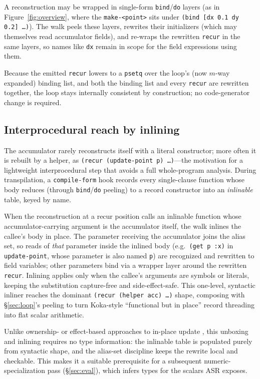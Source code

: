 \documentclass[sigplan,screen,review,anonymous]{acmart}
\begin{document}
A reconstruction may be wrapped in single-form \texttt{bind}/\texttt{do} layers
(as in Figure~\ref{fig:overview}, where the \texttt{make-<point>} sits under
\texttt{(bind [dx 0.1 dy 0.2] \ldots)}). The walk peels these layers, rewrites
their initializers (which may themselves read accumulator fields), and re-wraps
the rewritten \texttt{recur} in the same layers, so names like \texttt{dx}
remain in scope for the field expressions using them.

Because the emitted \texttt{recur} lowers to a \texttt{psetq} over the loop's
(now $m$-way expanded) binding list, and both the binding list and every
\texttt{recur} are rewritten together, the loop stays internally consistent by
construction; no code-generator change is required.

\subsection{Interprocedural reach by inlining}
\label{sec:inline}

The accumulator rarely reconstructs itself with a literal constructor; more
often it is rebuilt by a helper, as \texttt{(recur (update-point p) \ldots)}---the
motivation for a lightweight interprocedural step that avoids a full
whole-program analysis. During transpilation, a
\texttt{compile-form} hook records every single-clause function whose body
reduces (through \texttt{bind}/\texttt{do} peeling) to a record constructor
into an \emph{inlinable} table, keyed by name.

When the reconstruction at a recur position calls an inlinable function
whose accumulator-carrying argument is the accumulator itself, the walk
inlines the callee's body in place. The parameter receiving the
accumulator joins the alias set, so reads of \emph{that} parameter inside
the inlined body (e.g.\ \texttt{(get p :x)} in \texttt{update-point}, whose
parameter is also named \texttt{p}) are recognized and rewritten to field
variables; other parameters bind via a wrapper layer around the
rewritten \texttt{recur}. Inlining applies only when the callee's arguments
are symbols or literals, keeping the substitution capture-free and
side-effect-safe. This one-level, syntactic inliner reaches the dominant
\texttt{(recur (helper acc) \ldots)} shape, composing with \S\ref{sec:loop}'s
peeling to turn Koka-style ``functional but in place'' record
threading into flat scalar arithmetic.

Unlike ownership- or effect-based approaches to in-place update
\cite{reinking2021perceus,lorenzen2023functional}, this unboxing and inlining
requires no type information: the inlinable table is populated purely from
syntactic shape, and the alias-set discipline keeps the rewrite local and
checkable. This makes it a suitable prerequisite for a subsequent
numeric-specialization pass (\S\ref{sec:eval}), which infers types for the scalars ASR exposes.
\end{document}
